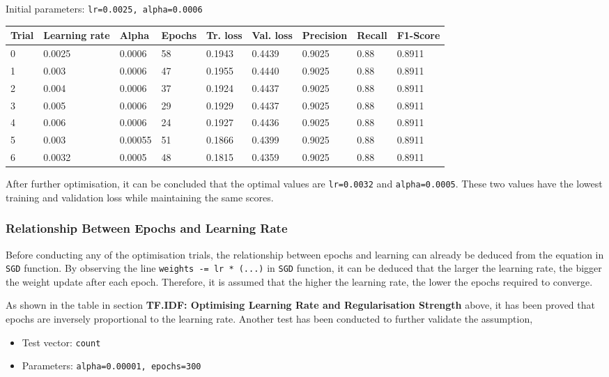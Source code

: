 \documentclass[11pt]{article}
\providecommand{\tightlist}{%
      \setlength{\itemsep}{0pt}\setlength{\parskip}{0pt}}
\begin{document}
Initial parameters: \texttt{lr=0.0025,\ alpha=0.0006}

\begin{longtable}[]{@{}lllllllll@{}}
\toprule
Trial & Learning rate & Alpha & Epochs & Tr. loss & Val. loss &
Precision & Recall & F1-Score\tabularnewline
\midrule
\endhead
0 & 0.0025 & 0.0006 & 58 & 0.1943 & 0.4439 & 0.9025 & 0.88 &
0.8911\tabularnewline
1 & 0.003 & 0.0006 & 47 & 0.1955 & 0.4440 & 0.9025 & 0.88 &
0.8911\tabularnewline
2 & 0.004 & 0.0006 & 37 & 0.1924 & 0.4437 & 0.9025 & 0.88 &
0.8911\tabularnewline
3 & 0.005 & 0.0006 & 29 & 0.1929 & 0.4437 & 0.9025 & 0.88 &
0.8911\tabularnewline
4 & 0.006 & 0.0006 & 24 & 0.1927 & 0.4436 & 0.9025 & 0.88 &
0.8911\tabularnewline
5 & 0.003 & 0.00055 & 51 & 0.1866 & 0.4399 & 0.9025 & 0.88 &
0.8911\tabularnewline
6 & 0.0032 & 0.0005 & 48 & 0.1815 & 0.4359 & 0.9025 & 0.88 &
0.8911\tabularnewline
\bottomrule
\end{longtable}

After further optimisation, it can be concluded that the optimal values
are \texttt{lr=0.0032} and \texttt{alpha=0.0005}. These two values have
the lowest training and validation loss while maintaining the same
scores.

\hypertarget{relationship-between-epochs-and-learning-rate}{%
\subsubsection{Relationship Between Epochs and Learning
Rate}\label{relationship-between-epochs-and-learning-rate}}

Before conducting any of the optimisation trials, the relationship
between epochs and learning can already be deduced from the equation in
\texttt{SGD} function. By observing the line
\texttt{weights\ -=\ lr\ *\ (...)} in \texttt{SGD} function, it can be
deduced that the larger the learning rate, the bigger the weight update
after each epoch. Therefore, it is assumed that the higher the learning
rate, the lower the epochs required to converge.

As shown in the table in section \textbf{TF.IDF: Optimising Learning
Rate and Regularisation Strength} above, it has been proved that epochs
are inversely proportional to the learning rate. Another test has been
conducted to further validate the assumption,

\begin{itemize}
\tightlist
\item
  Test vector: \texttt{count}
\item
  Parameters: \texttt{alpha=0.00001,\ epochs=300}
\end{itemize}
\end{document}
